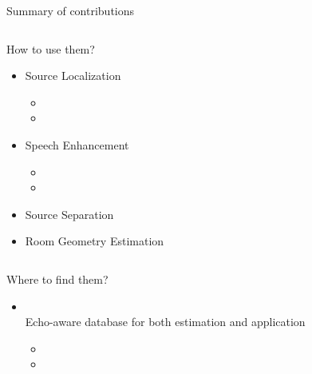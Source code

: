 \begin{frame}[t]{Summary of contributions}
\begin{columns}[T,onlytextwidth]
        \begin{column}{0.48\textwidth}
            \begin{center}
                \alert{How to use them?}
            \end{center}
            \begin{itemize}
                \item Source Localization{\footnotesize
                \begin{itemize}
                    \item[\cmark] 
                    \item[\xmark] 
                \end{itemize}}
                \item Speech Enhancement{\footnotesize
                \begin{itemize}
                    \item[\cmark] 
                    \item[\xmark] 
                \end{itemize}}
                \item \textcolor{gray!70}{Source Separation {\footnotesize\faReply}}
                \item \textcolor{gray!70}{Room Geometry Estimation {\footnotesize\faReply}}
            \end{itemize}
        \end{column}
    \end{columns}


    \begin{block}{}
        \alert{Where to find them?}
        \begin{itemize}
            \item \dechorate
            \\Echo-aware database for both estimation and application{\footnotesize
            \begin{itemize}
                \item[\cmark] 
                \item[\cmark] 
            \end{itemize}}
        \end{itemize}
    \end{block}

\end{frame}

